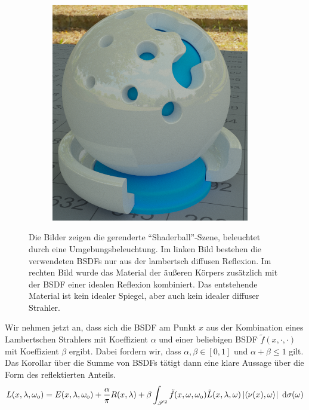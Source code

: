 \begin{figure}[h]
\begin{subfigure}[b]{0.5\textwidth}
				\includegraphics[width=0.95\textwidth]{pic/shaderball-bsdf_sum-specular.png}
			\end{subfigure}
			\caption[Wirkung zusammengesetzter Materialien anhand der \enquote{Shaderball}-Szene]{Die Bilder zeigen die gerenderte \enquote{Shaderball}-Szene, beleuchtet durch eine Umgebungsbeleuchtung. Im linken Bild bestehen die verwendeten BSDFs nur aus der lambertsch diffusen Reflexion. Im rechten Bild wurde das Material der äußeren Körpers zusätzlich mit der BSDF einer idealen Reflexion kombiniert. Das entstehende Material ist kein idealer Spiegel, aber auch kein idealer diffuser Strahler.}
			\label{fig:shaderball-bsdf-sum}
		\end{figure}

		Wir nehmen jetzt an, dass sich die BSDF am Punkt $x$ aus der Kombination eines Lambertschen Strahlers mit Koeffizient $\alpha$ und einer beliebigen BSDF $\tilde{f}(x,\cdot,\cdot)$ mit Koeffizient $\beta$ ergibt.
		Dabei fordern wir, dass $\alpha,\beta\in[0,1]$ und $\alpha +\beta\leq 1$ gilt.
		Das Korollar über die Summe von BSDFs tätigt dann eine klare Aussage über die Form des reflektierten Anteils.
		\[
			L(x,\lambda,\omega_{\mathrm{o}}) = E(x,\lambda,\omega_{\mathrm{o}}) + \frac{\alpha}{\pi}R(x,\lambda) + \beta \int_{\mathscr{S}^{2}}^{} \tilde{f}(x,\omega,\omega_{\mathrm{o}})\tilde{L}(x,\lambda,\omega)\left\vert \left\langle \nu(x),\omega \right\rangle \right\vert\ \mathrm{d} \sigma(\omega)
		\]

